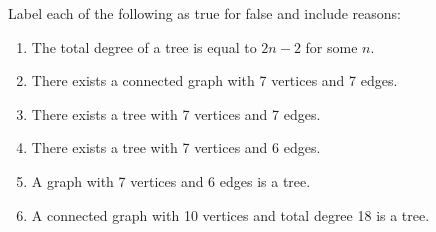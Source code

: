 \begin{practiceprob}
Label each of the following as true for false and include reasons:
\begin{enumerate}
    \setlength\itemsep{3\baselineskip}
    \item The total degree of a tree is equal to \(2n-2\) for some \(n\).
    \item There exists a connected graph with 7 vertices and 7 edges.
    \item There exists a tree with 7 vertices and 7 edges.
    \item There exists a tree with 7 vertices and 6 edges.
    \item A graph with 7 vertices and 6 edges is a tree.
    \item A connected graph with 10 vertices and total degree 18 is a tree.\vspace{3\baselineskip}
\end{enumerate}
\end{practiceprob}